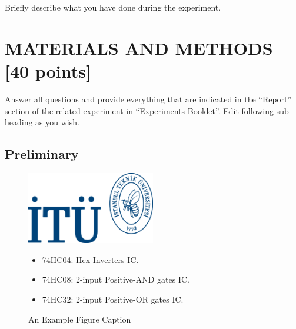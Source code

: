 \documentclass[pdftex,12pt,a4paper]{article}
\begin{document}
Briefly describe what you have done during the experiment.

\section{MATERIALS AND METHODS [40 points]}
Answer all questions and provide everything that are indicated in the “Report” section of the related experiment in “Experiments Booklet”.
Edit following sub-heading as you wish.

\subsection{Preliminary}
\begin{figure}[H]
	\centering
	\includegraphics[width=0.5\textwidth]{logo.png}	
	\caption{An Example Figure Caption\cite{ref1}}
	\label{fig1}
 \begin{itemize}
       \item 74HC04: Hex Inverters IC.
       \item 74HC08: 2-input Positive-AND gates IC.
       \item 74HC32: 2-input Positive-OR gates IC.
   \end{itemize}
\end{figure}
\end{document}
